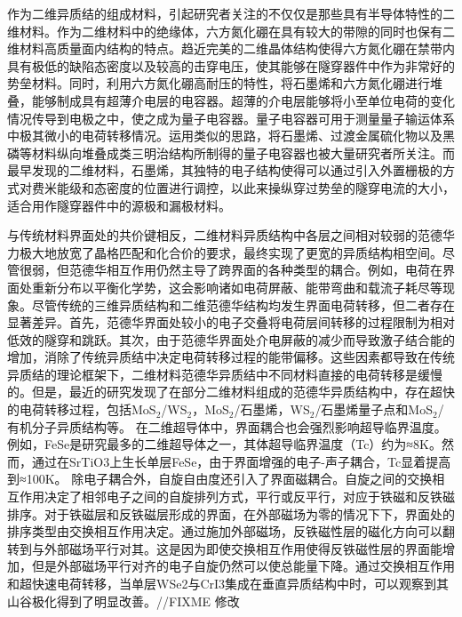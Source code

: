 作为二维异质结的组成材料，引起研究者关注的不仅仅是那些具有半导体特性的二维材料。作为二维材料中的绝缘体，六方氮化硼在具有较大的带隙的同时也保有二维材料高质量面内结构的特点。趋近完美的二维晶体结构使得六方氮化硼在禁带内具有极低的缺陷态密度以及较高的击穿电压，使其能够在隧穿器件中作为非常好的势垒材料。同时，利用六方氮化硼高耐压的特性，将石墨烯和六方氮化硼进行堆叠，能够制成具有超薄介电层的电容器。超薄的介电层能够将小至单位电荷的变化情况传导到电极之中，使之成为量子电容器。量子电容器可用于测量量子输运体系中极其微小的电荷转移情况。运用类似的思路，将石墨烯、过渡金属硫化物以及黑磷等材料纵向堆叠成类三明治结构所制得的量子电容器也被大量研究者所关注。而最早发现的二维材料，石墨烯，其独特的电子结构使得可以通过引入外置栅极的方式对费米能级和态密度的位置进行调控，以此来操纵穿过势垒的隧穿电流的大小，适合用作隧穿器件中的源极和漏极材料。

与传统材料界面处的共价键相反，二维材料异质结构中各层之间相对较弱的范德华力极大地放宽了晶格匹配和化合价的要求，最终实现了更宽的异质结构相空间。尽管很弱，但范德华相互作用仍然主导了跨界面的各种类型的耦合。例如，电荷在界面处重新分布以平衡化学势，这会影响诸如电荷屏蔽、能带弯曲和载流子耗尽等现象。尽管传统的三维异质结构和二维范德华结构均发生界面电荷转移，但二者存在显著差异。首先，范德华界面处较小的电子交叠将电荷层间转移的过程限制为相对低效的隧穿和跳跃。其次，由于范德华界面处介电屏蔽的减少而导致激子结合能的增加，消除了传统异质结中决定电荷转移过程的能带偏移。这些因素都导致在传统异质结的理论框架下，二维材料范德华异质结中不同材料直接的电荷转移是缓慢的。但是，最近的研究发现了在部分二维材料组成的范德华异质结构中，存在超快的电荷转移过程，包括MoS$_2$/WS$_2$，MoS$_2$/石墨烯，WS$_2$/石墨烯量子点和MoS$_2$/有机分子异质结构等。%
在二维超导体中，界面耦合也会强烈影响超导临界温度。例如，FeSe是研究最多的二维超导体之一，其体超导临界温度（Tc）约为≈8K。然而，通过在SrTiO3上生长单层FeSe，由于界面增强的电子-声子耦合，Tc显着提高到≈100K。
除电子耦合外，自旋自由度还引入了界面磁耦合。自旋之间的交换相互作用决定了相邻电子之间的自旋排列方式，平行或反平行，对应于铁磁和反铁磁排序。对于铁磁层和反铁磁层形成的界面，在外部磁场为零的情况下下，界面处的排序类型由交换相互作用决定。通过施加外部磁场，反铁磁性层的磁化方向可以翻转到与外部磁场平行对其。这是因为即使交换相互作用使得反铁磁性层的界面能增加，但是外部磁场平行对齐的电子自旋仍然可以使总能量下降。通过交换相互作用和超快速电荷转移，当单层WSe2与CrI3集成在垂直异质结构中时，可以观察到其山谷极化得到了明显改善。//FIXME 修改

